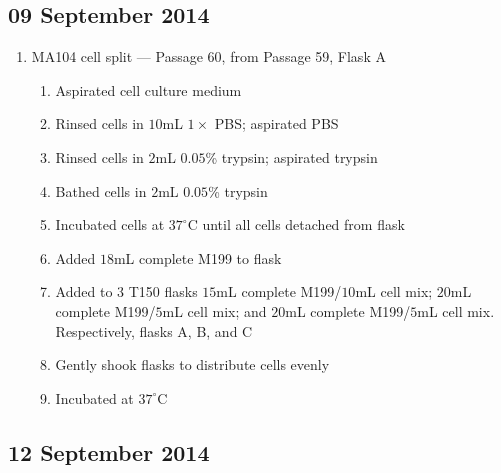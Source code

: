 
\subsection*{09 September 2014}

\begin{enumerate}
	\item MA104 cell split --- Passage 60, from Passage 59, Flask A
		\begin{enumerate}
			\item Aspirated cell culture medium
			\item Rinsed cells in $10$mL $1\times$ PBS; aspirated PBS
			\item Rinsed cells in $2$mL $0.05$\% trypsin; aspirated trypsin
			\item Bathed cells in $2$mL $0.05$\% trypsin
			\item Incubated cells at $37^{\circ}$C until all cells detached from flask
			\item Added $18$mL complete M199 to flask
			\item Added to $3$ T150 flasks $15$mL complete M199/$10$mL cell mix; $20$mL complete M199/$5$mL cell mix; and $20$mL complete M199/$5$mL cell mix. Respectively, flasks A, B, and C
			\item Gently shook flasks to distribute cells evenly
			\item Incubated at $37^{\circ}$C
		\end{enumerate}
\end{enumerate}

\subsection*{12 September 2014}

